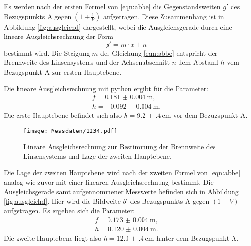 Es werden nach der ersten Formel von \eqref{eqn:abbe} die Gegenstandsweiten $g'$ des Bezugspunkts A
gegen $(1+\frac{1}{V})$ aufgetragen. Diese Zusammenhang ist in Abbildung \ref{fig:ausgleichd}
dargestellt, wobei die Ausgleichsgerade durch eine lineare Ausgleichsrechnung der Form
\begin{equation}
	g' = m \cdot x + n
\end{equation}
bestimmt wird. Die Steigung $m$ der Gleichung \ref{eqn:abbe} entspricht der Brennweite des
Linsensystems und der Achsenabschnitt $n$ dem Abstand $h$ vom Bezugspunkt A zur ersten
Hauptebene.

Die lineare Ausgleichsrechnung mit python ergibt für die Parameter:
\begin{gather*}
	f = \SI{0.181(4)}{\meter} \text{,} \\
	h = -\SI{0.092(4)}{\meter} \text{.}
\end{gather*}
Die erste Hauptebene befindet sich also $h=\SI{9.2(4)}{\centi\meter}$ vor dem Bezugspunkt A.

\begin{figure}
  \centering
  \texttt{[image: Messdaten/1234.pdf]}
  \caption{Lineare Ausgleichsrechnung zur Bestimmung der Brennweite des Linsensystems und Lage der zweiten Hauptebene.}
  \label{fig:ausgleichd2}
\end{figure}



Die Lage der zweiten Hauptebene wird nach der zweiten Formel von \eqref{eqn:abbe} analog wie
zuvor mit einer linearen Ausgleichsrechnung bestimmt.
Die Ausgleichsgerade samt aufgennommener Messwerte befinden sich in Abbildung \ref{fig:ausgleichd}. Hier wird die Bildweite $b'$ des Bezugspunkts A gegen $(1+V)$ aufgetragen.
Es ergeben sich die Parameter:
\begin{gather*}
	f = \SI{0.173(4)}{\meter} \text{,}  \\
	h = \SI{0.120(4)}{\meter} \text{.}
\end{gather*}
Die zweite Hauptebene liegt also $h=\SI{12.0(4)}{\centi\meter}$ hinter dem Bezugspunkt A.
